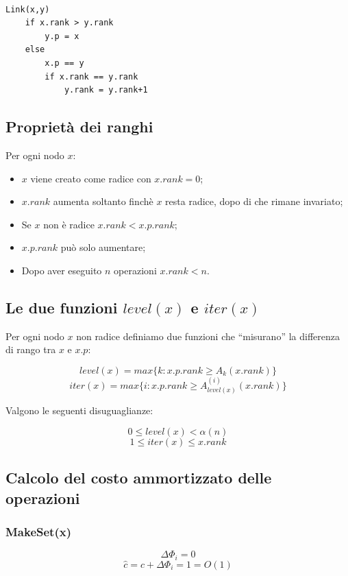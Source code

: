 \begin{lstlisting}

Link(x,y)
	if x.rank > y.rank
		y.p = x
	else
		x.p == y
		if x.rank == y.rank
			y.rank = y.rank+1

\end{lstlisting}

\subsection{Proprietà dei ranghi}

Per ogni nodo $x$:

\begin{itemize}

\item $x$ viene creato come radice con $x.rank = 0$;
\item $x.rank$ aumenta soltanto finchè $x$ resta radice, dopo di che rimane invariato;
\item Se $x$ non è radice $x.rank<x.p.rank$;
\item $x.p.rank$ può solo aumentare;
\item Dopo aver eseguito $n$ operazioni $x.rank<n$.

\end{itemize}

\subsection{Le due funzioni $level(x)$ e $iter(x)$}

Per ogni nodo $x$ non radice definiamo due funzioni che ``misurano'' la differenza di rango tra $x$ e $x.p$:

$$level(x)=max\{k:x.p.rank \ge A_k(x.rank)\}$$
$$iter(x)=max\{i:x.p.rank \ge A_{level(x)}^{(i)}(x.rank)\}$$

Valgono le seguenti disuguaglianze:

$$ 0 \le level(x) < \alpha(n)$$
$$1\le iter(x) \le x.rank $$

\subsection{Calcolo del costo ammortizzato delle operazioni}

\subsubsection{MakeSet(x)}

$$\Delta\Phi_i=0$$
$$\hat{c}=c+\Delta\Phi_i=1=O(1)$$

